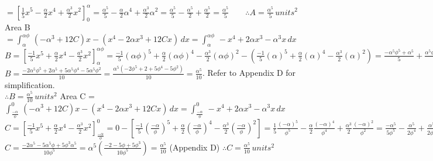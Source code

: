 \documentclass{homework}
\begin{document}
\begin{flushleft}
    $=[\frac{1}{5}x^5 -\frac{\alpha}{2} 
    x^4+\frac{\alpha^3}{2}x^2]_0^\alpha=\frac{\alpha^5}{5} -\frac{\alpha}{2} \alpha^4+\frac{\alpha^3}{2}\alpha^2=\frac{\alpha^5}{5}-\frac{\alpha^5}{2}+\frac{\alpha^5}{2}=\frac{\alpha^5}{5} \hspace{2em} \therefore A=\frac{\alpha^5}{5}\, units^2$ \vspace{1.8em} \\
    Area B $ = \int_\alpha^{\alpha\phi} \, (-\alpha^3+12C)x-(x^4-2\alpha x^3+12Cx)\, dx =  \int_\alpha^{\alpha\phi} \, - x^4+ 2\alpha  x^3-\alpha ^3x \, dx$ \vspace{0.8em} \\
    $B=[\frac{-1}{5}x^5+\frac{\alpha}{2} x^4-\frac{a^3}{2}x^2]_\alpha^{\alpha \phi}
    =\frac{-1}{5}(\alpha \phi)^5+\frac{\alpha}{2} (\alpha \phi)^4-\frac{\alpha^3}{2}(\alpha \phi)^2-(\frac{-1}{5}(\alpha )^5+\frac{\alpha}{2} (\alpha )^4-\frac{\alpha^3}{2}(\alpha)^2)=
    \frac{-\alpha^5\phi^5+\alpha^5}{5}+\frac{\alpha^5\phi^4-\alpha^5\phi^2}{2}$ \vspace{0.8em} \\
    $B=\frac{-2\alpha^5\phi^5+2\alpha^5+5\alpha^5\phi^4-5\alpha^5\phi^2}{10}=\frac{\alpha^5(-2\phi^5+2+5\phi^4-5\phi^2)}{10}=\frac{\alpha^5}{10}$. \hspace{3em} Refer to Appendix D for simplification. \vspace{0.8em} \\
    $\therefore B=\frac{\alpha^5}{10}\, units^2$ \newpage
    Area C = $\int_{\frac{-\alpha}{\phi}}^{0}\, (-\alpha^3+12C)x-(x^4-2\alpha x^3+12Cx)\, dx
    =\int_{\frac{-\alpha}{\phi}}^{0}\, -x^4+2\alpha x^3-\alpha^3x\, dx$ \vspace{0.8em} \\
    $C=[\frac{-1}{5}x^5+\frac{\alpha}{2} x^4-\frac{\alpha^3}{2}x^2]_{\frac{-\alpha}{\phi}}^0
    =0-[\frac{-1}{5}(\frac{-\alpha}{\phi})^5+\frac{\alpha}{2} (\frac{-\alpha}{\phi})^4-\frac{\alpha^3}{2}(\frac{-\alpha}{\phi})^2]
    =\frac{1}{5}\frac{(-\alpha)^5}{\phi^5}-\frac{\alpha}{2}\frac{(-\alpha)^4}{\phi^4}+\frac{\alpha^3}{2}\frac{(-\alpha)^2}{\phi^2}
    =\frac{-\alpha^5}{5\phi^5}- \frac{\alpha^5}{2\phi^4}+\frac{\alpha^5}{2\phi^2}$ \vspace{0.8em} \\
    $C=\frac{-2\alpha^5-5\alpha^5\phi+5\phi^3\alpha^5}{10\phi^5}=\alpha^5(\frac{-2-5\phi+5\phi^3}{10\phi^5})=\frac{\alpha^5}{10}$ \hspace{3em} (Appendix D) \hspace{2em} $\therefore C=\frac{\alpha^5}{10} \, units^2$ \vspace{1.8em} \\

\end{flushleft}
\end{document}
